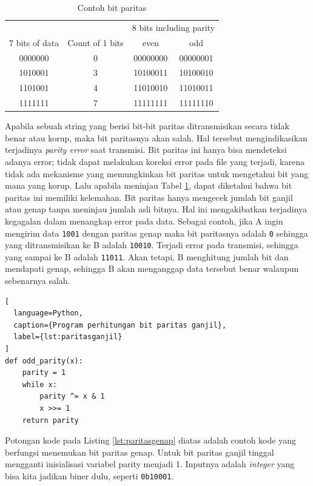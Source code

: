 \begin{table}
  \caption{Contoh bit paritas}
  \label{tab:parityexample}
  \centering
  \begin{tabular}{cccc}
    \toprule
    & & \multicolumn{2}{c}{8 bits including parity} \\
    7 bits of data & Count of 1 bits & even & odd \\
    \midrule
    0000000        & 0               & 00000000 & 00000001 \\
    1010001        & 3               & 10100011 & 10100010 \\
    1101001        & 4               & 11010010 & 11010011 \\
    1111111        & 7               & 11111111 & 11111110 \\
    \bottomrule
  \end{tabular}
\end{table}

Apabila sebuah string yang berisi bit-bit paritas ditransmisikan secara tidak benar atau korup, maka bit paritasnya akan salah. Hal tersebut mengindikasikan terjadinya \emph{parity error} saat transmisi. Bit paritas ini hanya bisa mendeteksi adanya error; tidak dapat melakukan koreksi error pada file yang terjadi, karena tidak ada mekanisme yang memungkinkan bit paritas untuk mengetahui bit yang mana yang korup. Lalu apabila meninjau Tabel \ref{tab:parityexample}, dapat diketahui bahwa bit paritas ini memiliki kelemahan. Bit paritas hanya mengecek jumlah bit ganjil atau genap tanpa meninjau jumlah asli bitnya. Hal ini mengakibatkan terjadinya kegagalan dalam menangkap error pada data. Sebagai contoh, jika A ingin mengirim data \verb|1001| dengan paritas genap maka bit paritasnya adalah \verb|0| sehingga yang ditransmisikan ke B adalah \verb|10010|. Terjadi error pada transmisi, sehingga yang sampai ke B adalah \verb|11011|. Akan tetapi, B menghitung jumlah bit dan mendapati genap, sehingga B akan menganggap data tersebut benar walaupun sebenarnya salah.



\begin{lstlisting}[
  language=Python,
  caption={Program perhitungan bit paritas ganjil},
  label={lst:paritasganjil}
]
def odd_parity(x):
    parity = 1
    while x:
        parity ^= x & 1
        x >>= 1
    return parity
\end{lstlisting}

Potongan kode pada Listing \ref{lst:paritasgenap} diatas adalah contoh kode yang berfungsi menemukan bit paritas genap. Untuk bit paritas ganjil tinggal mengganti inisialisasi variabel parity menjadi 1. Inputnya adalah \emph{integer} yang bisa kita jadikan biner dulu, seperti \verb|0b10001|.

